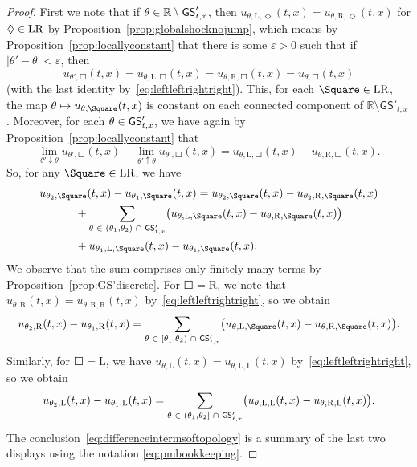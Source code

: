 \documentclass[AHL,Unicode,longabstracts]{cedram}
\newcommand*\GS{\mathsf{GS}}
\newcommand*\RR{\mathbb{R}}
\newcommand*\Left{\mathrm{L}}
\newcommand*\Right{\mathrm{R}}
\newcommand*\LR{\mathrm{LR}}
\newcommand*\eps{\varepsilon}
\let\oldmapsto\mapsto
\renewcommand*{\mapsto}{\mathchoice{\longmapsto}{\oldmapsto}{\oldmapsto}{\oldmapsto}}
\let\oldin\in
\renewcommand{\in}{\mathchoice{\oldin}{\oldin}{\,\oldin\,}{\,\oldin\,}}
\let\oldcap\cap
\renewcommand{\cap}{\mathchoice{\oldcap}{\oldcap}{\,\oldcap\,}{\,\oldcap\,}}
\newcommand*\RR{\mathbb{R}}
\begin{document}
\begin{proof}
First we note that if $\theta\in\RR\setminus\GS'_{t,x}$, then $u_{\theta,\Left,\Diamond}(t,x)=u_{\theta,\Right,\Diamond}(t,x)$ for $\Diamond\in\LR$ by Proposition~\ref{prop:globalshocknojump}, which means by Proposition~\ref{prop:locallyconstant} that there is some $\eps>0$ such that if $|\theta'-\theta|<\eps$, then
\[
u_{\theta',\Square}(t,x)=u_{\theta,\Left,\Square}(t,x)=u_{\theta,\Right,\Square}(t,x)=u_{\theta,\Square}(t,x)
\]
(with the last identity by~\eqref{eq:leftleftrightright}). This, for each $\Square\in\LR$, the map $\theta\mapsto u_{\theta,\Square}(t,x)$ is constant on each connected component of $ \RR\setminus\GS'_{t,x}$. Moreover, for each $\theta\in\GS'_{t,x}$, we have again by Proposition~\ref{prop:locallyconstant} that
\[
\lim_{\theta'\downarrow\theta}u_{\theta',\Square}(t,x)-\lim_{\theta'\uparrow\theta}u_{\theta',\Square}(t,x)=u_{\theta,\Left,\Square}(t,x)-u_{\theta,\Right,\Square}(t,x).
\]
So, for any $\Square\in\LR$, we have
\begin{multline*}
u_{\theta_{2},\Square}(t,x)-u_{\theta_{1},\Square}(t,x) =u_{\theta_{2},\Square}(t,x)-u_{\theta_{2},\Right,\Square}(t,x)\\
\begin{aligned}
&+\sum_{\theta\in(\theta_{1},\theta_{2})\cap\GS'_{t,x}}\bigl(u_{\theta,\Left,\Square}(t,x)-u_{\theta,\Right,\Square}(t,x)\bigr)\\
&+u_{\theta_{1},\Left,\Square}(t,x)-u_{\theta_{1},\Square}(t,x).
\end{aligned}
\end{multline*}
We observe that the sum comprises only finitely many terms by Proposition~\ref{prop:GS'discrete}. For $\Square=\Right$, we note that $u_{\theta,\Right}(t,x)=u_{\theta,\Right,\Right}(t,x)$ by~\eqref{eq:leftleftrightright}, so we obtain
\[
u_{\theta_{2},\Right}(t,x)-u_{\theta_{1},\Right}(t,x)=\sum_{\theta\in[\theta_{1},\theta_{2})\cap\GS'_{t,x}}\bigl(u_{\theta,\Left,\Square}(t,x)-u_{\theta,\Right,\Square}(t,x)\bigr).
\]
Similarly, for $\Square=\Left$, we have $u_{\theta,\Left}(t,x)=u_{\theta,\Left,\Left}(t,x)$ by~\eqref{eq:leftleftrightright}, so we obtain
\[
u_{\theta_{2},\Left}(t,x)-u_{\theta_{1},\Left}(t,x)=\sum_{\theta\in(\theta_{1},\theta_{2}]\cap\GS'_{t,x}}\bigl(u_{\theta,\Left,\Left}(t,x)-u_{\theta,\Right,\Left}(t,x)\bigr).
\]
The conclusion~\eqref{eq:differenceintermsoftopology} is a summary of the last two displays using the notation \eqref{eq:pmbookkeeping}.
\end{proof}
\end{document}

